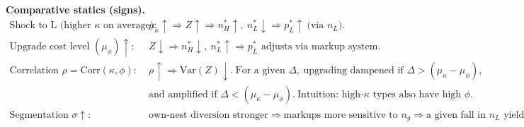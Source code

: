 \documentclass{article}
\begin{document}
\medskip
\textbf{Comparative statics (signs).}
\begin{align*}
\text{Shock to L (higher }\kappa\text{ on average)}:\;& 
\mu_\kappa\uparrow \Rightarrow Z\uparrow \Rightarrow n_H^\ast\uparrow,\ n_L^\ast\downarrow \Rightarrow p_L^\ast\uparrow\ \text{(via }n_L).\\
\text{Upgrade cost level }(\mu_\phi)\uparrow:\;&
Z\downarrow \Rightarrow n_H^\ast\downarrow,\ n_L^\ast\uparrow \Rightarrow p_L^\ast \text{ adjusts via markup system}.\\
\text{Correlation } \rho=\mathrm{Corr}(\kappa,\phi):\;&
\rho\uparrow \Rightarrow \mathrm{Var}(Z)\downarrow.\ \text{For a given }\Delta,\ \text{upgrading dampened if }\Delta>(\mu_\kappa-\mu_\phi),\\
&\text{and amplified if }\Delta<(\mu_\kappa-\mu_\phi).\ \text{Intuition: high-}\kappa\text{ types also have high }\phi.\\
\text{Segmentation } \sigma\uparrow:\;&
\text{own-nest diversion stronger} \Rightarrow \text{markups more sensitive to }n_g \Rightarrow \text{a given fall in }n_L \text{ yields larger }\Delta p_L^\ast.
\end{align*}
\normalsize
\end{document}
